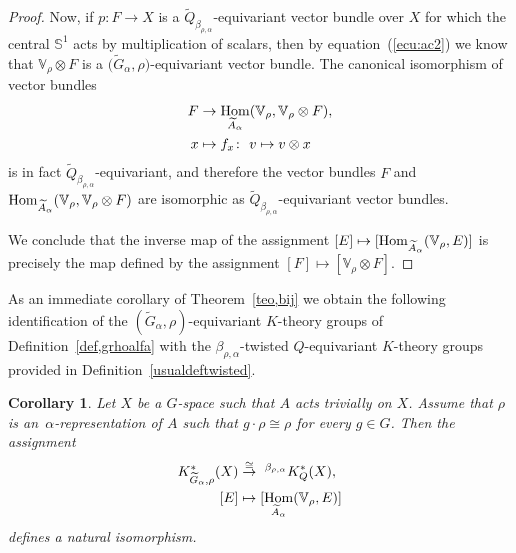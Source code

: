 \documentclass[11pt]{article}
\numberwithin{equation}{section}
\def\S{\mathbb{S}}
\def\V{\mathbb{V}}
\DeclareMathOperator{\Hom}{\textup{Hom}}
\newtheorem{Cor}[Th]{Corollary}
\theoremstyle{definition}
\numberwithin{equation}{section}
\begin{document}
\begin{proof}
Now, if $p\colon F\rightarrow X$ is a
$\widetilde{Q}_{\beta_{\rho,\alpha}}$-equivariant vector bundle over $X$
for which the central $\S^{1}$ acts by multiplication of
scalars, then by equation~(\ref{ecu:ac2}) we know that
$\V_{\rho}\otimes F$ is a
$\big(\widetilde{G}_{\alpha},\rho\big)$-equivariant vector bundle.
The canonical isomorphism of vector bundles
\begin{align*}
F&\rightarrow \Hom_{\widetilde{A}_{\alpha}}(
\V_{\rho}, \V_{\rho}\otimes F),
\\
x&\mapsto f_{x}\colon\ v\mapsto v\otimes x
\end{align*}
is in fact $\widetilde{Q}_{\beta_{\rho,\alpha}}$-equivariant, and therefore the vector
bundles $F$ and
$\Hom_{\widetilde{A}_{\alpha}}(\V_{\rho},\V_{\rho}\otimes
F)$ are isomorphic as
$\widetilde{Q}_{\beta_{\rho,\alpha}}$-equivariant vector bundles.
	
We conclude that the inverse map of the assignment
$[E]\mapsto[\Hom_{\widetilde{A}_{\alpha}}(\V_{\rho},E)]$
is precisely the map defined by the assignment $[F]\mapsto
[\V_{\rho}\otimes F]$.
\end{proof}


As an immediate corollary of Theorem~\ref{teo,bij} we obtain the following
identification of the $(\widetilde{G}_{\alpha}, \rho)$-equivariant $K$-theory groups of
Definition~\ref{def,grhoalfa} with the $\beta_{\rho,\alpha}$-twisted $Q$-equivariant
$K$-theory groups provided in Definition~\ref{usualdeftwisted}.

\begin{Cor}\label{identification}
Let $X$ be a $G$-space such that $A$ acts trivially on $X$. Assume that
$\rho$ is an~$\alpha$-re\-p\-resentation of $A$ such that
$g\cdot \rho\cong \rho$ for every $g\in G$. Then the assignment
\begin{align*}
K^{\ast}_{\widetilde{G}_{\alpha}, \rho}(X)
&\stackrel{\cong}{\rightarrow} \ ^{\beta_{\rho,\alpha}}K^{\ast}_{Q}(X),
\\
[E]&\mapsto [\Hom_{\widetilde{A}_{\alpha}}(\V_{\rho},E)]
\end{align*}
defines a natural isomorphism.
\end{Cor}
\end{document}
